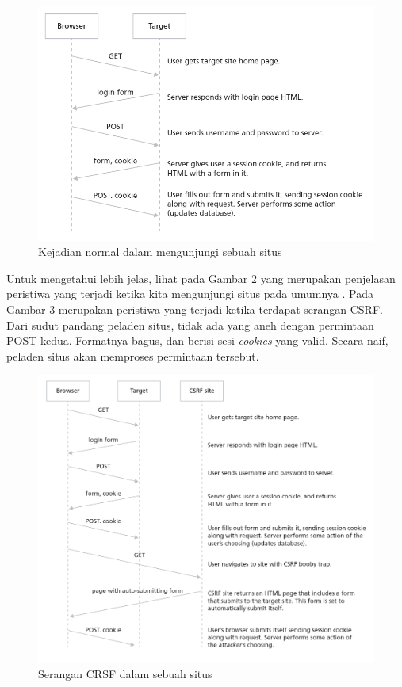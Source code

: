 \documentclass{article}
\begin{document}
\begin{figure}[htbp]
    \centering
    \includegraphics[scale=.6]{normal visit}
    \caption{Kejadian normal dalam mengunjungi sebuah situs}
    \label{fig:normal}
\end{figure}

Untuk mengetahui lebih jelas, lihat pada Gambar 2 yang merupakan penjelasan peristiwa yang terjadi ketika kita mengunjungi situs pada umumnya \cite{blatz2007csrf}. Pada Gambar 3 merupakan peristiwa yang terjadi ketika terdapat serangan CSRF. Dari sudut pandang peladen situs, tidak ada yang aneh dengan permintaan POST kedua. Formatnya bagus, dan berisi sesi \textit{cookies} yang valid. Secara naif, peladen situs akan memproses permintaan tersebut.

\begin{figure}[htbp]
    \centering
    \includegraphics[scale=.5]{csrf attack}
    \caption{Serangan CRSF dalam sebuah situs}
    \label{fig:attack}
\end{figure}
\end{document}
